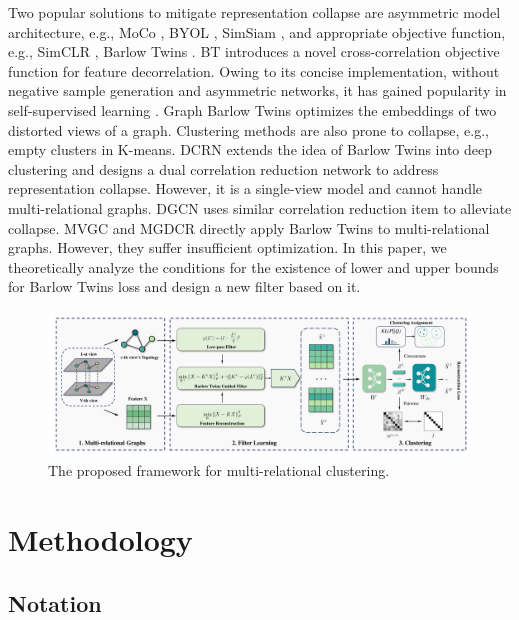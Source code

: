\documentclass[letterpaper]{article} %
\begin{document}
Two popular solutions to mitigate representation collapse are asymmetric model architecture, e.g., MoCo \cite{he2020momentum}, BYOL \cite{grill2020bootstrap}, SimSiam \cite{chen2021exploring}, and appropriate objective function, e.g., SimCLR \cite{chen2020simple}, Barlow Twins \cite{zbontar2021barlow}. BT introduces a novel cross-correlation objective function for feature decorrelation. Owing to its concise implementation, without negative sample generation and asymmetric networks, it has gained popularity in self-supervised learning \cite{zhang2021zero, zhang2022align}. Graph Barlow Twins \cite{bielak2022graph} optimizes the embeddings of two distorted views of a graph. Clustering methods are also prone to collapse, e.g., empty clusters in K-means. DCRN \cite{liu2022deep} extends the idea of Barlow Twins into deep clustering and designs a dual correlation reduction network to address representation collapse. However, it is a single-view model and cannot handle multi-relational graphs. DGCN \cite{pmlr-v202-pan23b} uses similar correlation reduction item to alleviate collapse. MVGC \cite{xia2022multi} and MGDCR \cite{mo2023multiplex} directly apply Barlow Twins to multi-relational graphs. However, they suffer insufficient optimization.
In this paper, we theoretically analyze the conditions for the existence of lower and upper bounds for Barlow Twins loss and design a new filter based on it.

\begin{figure}[htb]
    \centering
    \includegraphics[width=1\textwidth]{figure/architect.pdf}
    \caption{The proposed framework for multi-relational clustering.}
    \label{fig:architecture}
\end{figure}


\section{Methodology}

\subsection{Notation}
\end{document}
